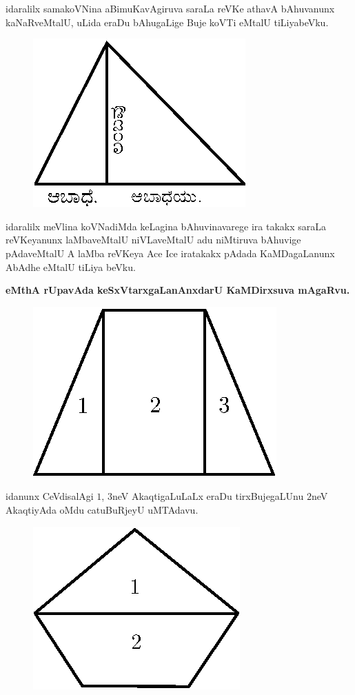 idaralilx samakoVNina aBimuKavAgiruva saraLa reVKe athavA bAhuvanunx
kaNaRveMtalU, uLida eraDu bAhugaLige Buje koVTi eMtalU tiLiyabeVku.
\begin{figure}[H]
\centering
\includegraphics[scale=.9]{figure/fig16.eps}
\end{figure}
idaralilx meVlina koVNadiMda keLagina bAhuvinavarege ira takakx saraLa
reVKeyanunx laMbaveMtalU niVLaveMtalU adu niMtiruva bAhuvige
pAdaveMtalU A laMba reVKeya Ace Ice iratakakx pAdada KaMDagaLanunx
AbAdhe eMtalU tiLiya beVku.

\eject

{\bf eMthA rUpavAda keSxVtarxgaLanAnxdarU KaMDirxsuva mAgaRvu.}

\begin{figure}[H]
\centering
\includegraphics[scale=.75]{figure/fig17.eps}
\end{figure}

idanunx CeVdisalAgi $1$, $3$neV AkaqtigaLuLaLx eraDu tirxBujegaLUnu $2$neV
AkaqtiyAda oMdu catuBuRjeyU uMTAdavu.

\begin{figure}[H]
\centering
\includegraphics[scale=.75]{figure/fig18.eps}
\end{figure}

